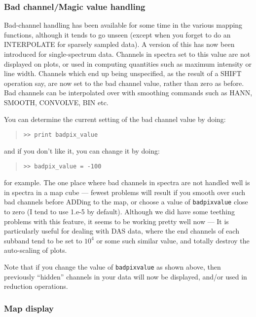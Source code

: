 \documentclass[twoside,11pt]{article}
\renewcommand{\_}{\texttt{\symbol{95}}}
\newenvironment{myquote}{\begin{quote}\begin{small}}{\end{small}\end{quote}}
\begin{document}
\subsubsection{Bad channel/Magic value handling}

Bad-channel handling has been available for some time in the various
mapping functions, although it tends to go unseen (except when you
forget to do an INTERPOLATE for sparsely sampled data). A version of
this has now been introduced for single-spectrum data. Channels in
spectra set to this value are not displayed on plots, or used in
computing quantities such as maximum intensity or line width. Channels
which end up being unspecified, as the result of a SHIFT operation say,
are now set to the bad channel value, rather than zero as before. Bad
channels can be interpolated over with smoothing commands such as HANN,
SMOOTH, CONVOLVE, BIN etc.

You can determine the current setting of the bad channel value by doing:
\begin{myquote}
\begin{verbatim}
>> print badpix_value
\end{verbatim}
\end{myquote}
and if you don't like it, you can change it by doing:
\begin{myquote}
\begin{verbatim}
>> badpix_value = -100
\end{verbatim}
\end{myquote}
for example. The one place where bad channels in spectra are not handled
well is in spectra in a map cube  --- fewest problems will result if you
smooth over such bad channels before ADDing to the map, or choose a value
of \texttt{badpix\_value} close to zero (I tend to use 1.e-5 by default). Although
we did have some teething problems with this feature, it seems to be working
pretty well now --- It is particularly useful for dealing with DAS data, where
the end channels of each subband tend to be set to $10^4$ or some such similar
value, and totally destroy the auto-scaling of plots.

Note that if you change the value of \texttt{badpix\_value} as shown above, then 
previously ``hidden'' channels in your data will now be displayed, and/or
used in reduction operations.


\subsubsection{Map display}
\end{document}
